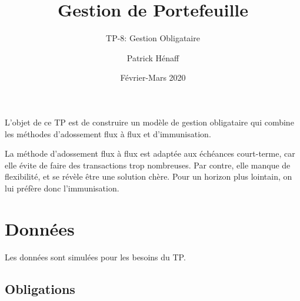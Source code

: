 \documentclass[
]{article}
\title{Gestion de Portefeuille}
\subtitle{TP-8: Gestion Obligataire}
\author{Patrick Hénaff}
\date{Février-Mars 2020}
\newenvironment{Shaded}{\begin{snugshade}}{\end{snugshade}}
\newcommand{\AttributeTok}[1]{\textcolor[rgb]{0.77,0.63,0.00}{#1}}
\newcommand{\ConstantTok}[1]{\textcolor[rgb]{0.00,0.00,0.00}{#1}}
\newcommand{\ControlFlowTok}[1]{\textcolor[rgb]{0.13,0.29,0.53}{\textbf{#1}}}
\newcommand{\DecValTok}[1]{\textcolor[rgb]{0.00,0.00,0.81}{#1}}
\newcommand{\FunctionTok}[1]{\textcolor[rgb]{0.00,0.00,0.00}{#1}}
\newcommand{\NormalTok}[1]{#1}
\newcommand{\OtherTok}[1]{\textcolor[rgb]{0.56,0.35,0.01}{#1}}
\newcommand{\SpecialCharTok}[1]{\textcolor[rgb]{0.00,0.00,0.00}{#1}}
\newcommand{\StringTok}[1]{\textcolor[rgb]{0.31,0.60,0.02}{#1}}
\begin{document}
\maketitle

L'objet de ce TP est de construire un modèle de gestion obligataire qui
combine les méthodes d'adossement flux à flux et d'immunisation.

La méthode d'adossement flux à flux est adaptée aux échéances
court-terme, car elle évite de faire des transactions trop nombreuses.
Par contre, elle manque de flexibilité, et se révèle être une solution
chère. Pour un horizon plus lointain, on lui préfère donc
l'immunisation.

\hypertarget{donnuxe9es}{%
\section{Données}\label{donnuxe9es}}

Les données sont simulées pour les besoins du TP.

\hypertarget{obligations}{%
\subsection{Obligations}\label{obligations}}

\begin{Shaded}
\end{Shaded}
\end{document}
